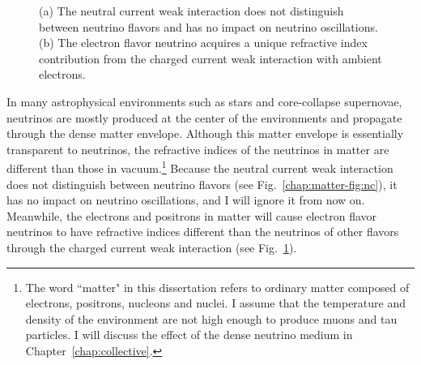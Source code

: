 \begin{figure}[htbp]
\begin{subfigure}[t]{0.40\textwidth}
    \caption{  }
    \label{chap:matter-fig:cc}
	\end{subfigure}
	\caption{
  (a) The neutral current weak interaction does not distinguish between neutrino flavors and has no impact on neutrino oscillations. (b) The electron flavor neutrino acquires a unique refractive index contribution from the charged current weak interaction with ambient electrons.
  }
    \label{chap:matter-fig:nc-cc}
\end{figure}

In many astrophysical environments such as stars and core-collapse supernovae, neutrinos are mostly produced at the center of the environments and propagate through the dense matter envelope. Although this matter envelope is essentially transparent to neutrinos, the refractive indices of the neutrinos in matter are different than those in vacuum.\footnote{The word ``matter" in this dissertation refers to ordinary matter composed of electrons, positrons, nucleons and nuclei. I assume that the temperature and density of the environment are not high enough to produce muons and tau particles. I will discuss the effect of the dense neutrino medium in Chapter~\ref{chap:collective}.} Because the neutral current weak interaction does not distinguish between neutrino flavors (see Fig.~\ref{chap:matter-fig:nc}), it has no impact on neutrino oscillations, and I will ignore it from now on. Meanwhile, the electrons and positrons in matter will cause electron flavor neutrinos to have refractive indices different than the neutrinos of other flavors through the charged current weak interaction (see Fig.~\ref{chap:matter-fig:cc}).
